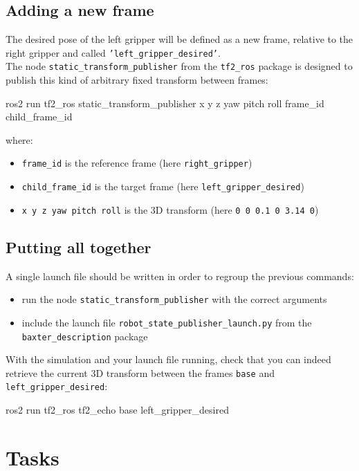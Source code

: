 \documentclass{ecnreport}
\begin{document}
\subsection{Adding a new frame}

The desired pose of the left gripper will be defined as a new frame, relative to the right gripper and called \texttt{'left\_gripper\_desired'}.\\
The node \texttt{static\_transform\_publisher} from the \texttt{tf2\_ros} package is designed to publish this kind of arbitrary fixed transform between frames:
\begin{bashcodelarge}
 ros2 run tf2_ros static_transform_publisher x y z yaw pitch roll frame_id child_frame_id
\end{bashcodelarge}where:
\begin{itemize}
\item \texttt{frame\_id} is the reference frame (here \texttt{right\_gripper})
\item \texttt{child\_frame\_id} is the target frame (here \texttt{left\_gripper\_desired})
 \item \texttt{x y z yaw pitch roll} is the 3D transform (here \texttt{0 0 0.1 0 3.14 0})
\end{itemize}

\subsection{Putting all together}

A single launch file should be written in order to regroup the previous commands:
\begin{itemize}
 \item run the node \texttt{static\_transform\_publisher} with the correct arguments
 \item include the launch file \texttt{robot\_state\_publisher\_launch.py} from the \texttt{baxter\_description} package
 \end{itemize}
 
 With the simulation and your launch file running, check that you can indeed retrieve the current 3D transform between the frames \texttt{base} and \texttt{left\_gripper\_desired}:
 \begin{bashcodelarge}
 ros2 run tf2_ros tf2_echo base left_gripper_desired
\end{bashcodelarge}

\section{Tasks}
\end{document}
